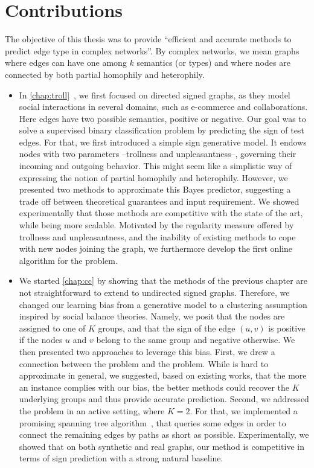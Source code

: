 \label{chap:conclusion}

\section{Contributions}

The objective of this thesis was to provide \enquote{efficient and accurate methods to predict edge
type in complex networks}. By complex networks, we mean graphs where edges can have one among $k$
semantics (or types) and where nodes are connected by both partial homophily and heterophily. 

\begin{itemize}

  \item In \autoref{chap:troll}~\autocite{trollSign17}, we first focused on directed signed graphs,
    as they model social interactions in several domains, such as e-commerce and collaborations.
    Here edges have two possible semantics, positive or negative. Our goal was to solve a supervised
    binary classification problem by predicting the sign of test edges. For that, we first
    introduced a simple sign generative model. It endows nodes with two parameters --trollness and
    unpleasantness--, governing their incoming and outgoing behavior. This might seem like a
    simplistic way of expressing the notion of partial homophily and heterophily. However, we
    presented two methods to approximate this Bayes predictor, suggesting a trade off between
    theoretical guarantees and input requirement. We showed experimentally that those methods are
    competitive with the state of the art, while being more scalable. Motivated by the regularity
    measure offered by trollness and unpleasantness, and the inability of existing methods to cope
    with new nodes joining the graph, we furthermore develop the first online algorithm for the
    \esp{} problem.

  \item We started \autoref{chap:cc} by showing that the methods of the previous chapter are not
    straightforward to extend to undirected signed graphs. Therefore, we changed our learning bias
    from a generative model to a clustering assumption inspired by social balance theories. Namely,
    we posit that the nodes are assigned to one of $K$ groups, and that the sign of the edge $(u,v)$
    is positive if the nodes $u$ and $v$ belong to the same group and negative otherwise. We then
    presented two approaches to leverage this bias. First, we drew a connection between the \esp{}
    problem and the \pcc{} problem. While \pcc{} is hard to approximate in general, we suggested,
    based on existing works, that the more an instance complies with our bias, the better \pcc{}
    methods could recover the $K$ underlying groups and thus provide accurate prediction. Second, we
    addressed the problem in an active setting, where $K=2$. For that, we implemented a promising
    spanning tree algorithm~\autocite{gtxFabio}, that queries some edges in order to connect the
    remaining edges by paths as short as possible. Experimentally, we showed that on both synthetic
    and real graphs, our method is competitive in terms of sign prediction with a strong natural
    baseline.


\end{itemize}
